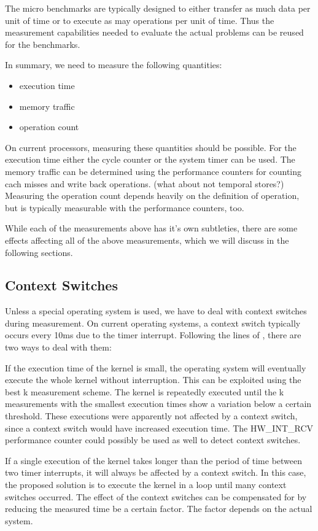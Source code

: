 \documentclass[a4paper,12pt]{article}
\begin{document}
The micro benchmarks are typically designed to either transfer as much data per unit of time or to execute as may operations per unit of time. Thus the measurement capabilities needed to evaluate the actual problems can be reused for the benchmarks. 

In summary, we need to measure the following quantities:
\begin{itemize}
\item execution time
\item memory traffic
\item operation count
\end{itemize}

On current processors, measuring these quantities should be possible. For the execution time either the cycle counter or the system timer can be used. The memory traffic can be determined using the performance counters for counting cach misses and write back operations. (what about not temporal stores?) Measuring the operation count depends heavily on the definition of operation, but is typically measurable with the performance counters, too.

While each of the measurements above has it's own subtleties, there are some effects affecting all of the above measurements, which we will discuss in the following sections.

\subsection{Context Switches}

Unless a special operating system is used, we have to deal with context switches during measurement. On current operating systems, a context switch typically occurs every 10ms due to the timer interrupt. Following the lines of \cite{ComSysProgPersp}, there are two ways to deal with them:

If the execution time of the kernel is small, the operating system will eventually execute the whole kernel without interruption. This can be exploited using the best k measurement scheme. The kernel is repeatedly executed until the k measurements with the smallest execution times show a variation below a certain threshold. These executions were apparently not affected by a context switch, since a context switch would have increased execution time. The HW\_INT\_RCV performance counter could possibly be used as well to detect context switches.

If a single execution of the kernel takes longer than the period of time between two timer interrupts, it will always be affected by a context switch. In this case, the proposed solution is to execute the kernel in a loop until many context switches occurred. The effect of the context switches can be compensated for by reducing the measured time be a certain factor. The factor depends on the actual system.
\end{document}
